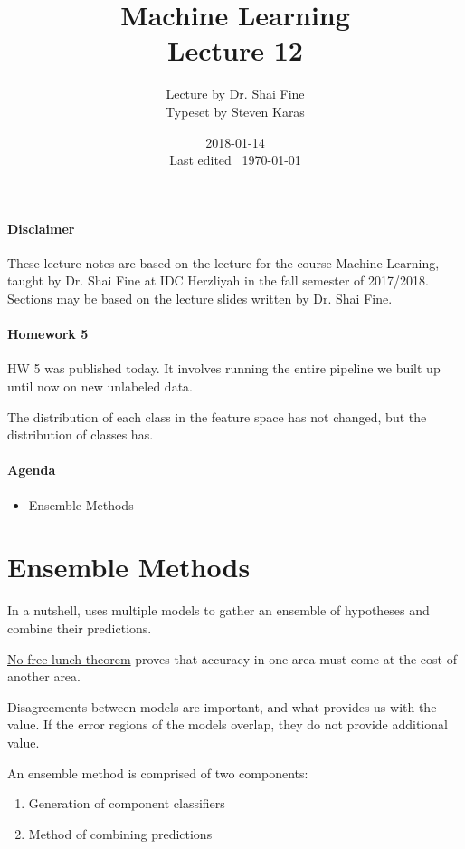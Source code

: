 \documentclass{idc_msc}
\title{Machine Learning\\\large Lecture 12}
\date{2018-01-14 \\ Last edited \currenttime\ \today}
\author{Lecture by Dr. Shai Fine\\Typeset by Steven Karas}
\begin{document}
\maketitle

\paragraph{Disclaimer}

These lecture notes are based on the lecture for the course Machine Learning, taught by Dr. Shai Fine at IDC Herzliyah in the fall semester of 2017/2018.
Sections may be based on the lecture slides written by Dr. Shai Fine.

\paragraph{Homework 5}

HW 5 was published today.
It involves running the entire pipeline we built up until now on new unlabeled data.

The distribution of each class in the feature space has not changed, but the distribution of classes has.

\paragraph{Agenda}

\begin{itemize}
  \item Ensemble Methods
\end{itemize}

\section{Ensemble Methods}

In a nutshell, uses multiple models to gather an ensemble of hypotheses and combine their predictions.

\href{http://www.no-free-lunch.org/}{No free lunch theorem} proves that accuracy in one area must come at the cost of another area.

Disagreements between models are important, and what provides us with the value.
If the error regions of the models overlap, they do not provide additional value.

An ensemble method is comprised of two components:

\begin{enumerate}
  \item Generation of component classifiers
  \item Method of combining predictions
\end{enumerate}
\end{document}
